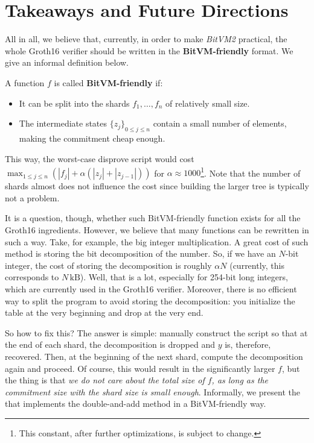 \documentclass{iacrtrans}
\begin{document}
\section{Takeaways and Future Directions}

All in all, we believe that, currently, in order to make
\textit{BitVM2} practical, the
whole Groth16 verifier should be written in the \textbf{BitVM-friendly} format.
We give an informal definition below.

\begin{definition}
  A function $f$ is called \textbf{BitVM-friendly} if:
  \begin{itemize}
    \item It can be split into the shards $f_1,\dots,f_n$ of
      relatively small size.
    \item The intermediate states ${\{z_j\}}_{0 \leq j \leq n}$ contain
      a small number of elements, making the commitment cheap enough.
  \end{itemize}

  This way, the worst-case disprove script would cost $\max_{1 \leq j \leq
  n}\left(|f_j| + \alpha(|z_j| + |z_{j-1}|)\right)$ for $\alpha \approx
  1000$\footnote{This constant, after further optimizations, is subject to
  change.}. Note that the number of shards almost does not influence the cost
  since building the larger tree is typically not a problem.
\end{definition}

It is a question, though, whether such BitVM-friendly function exists for all
the Groth16 ingredients. However, we believe that many functions can be
rewritten in such a way. Take, for example, the big integer multiplication. A
great cost of such method is storing the bit decomposition of the number. So, if
we have an $N$-bit integer, the cost of storing the decomposition is roughly
$\alpha N$ (currently, this corresponds to $N \, \text{kB}$). Well, that is a
lot, especially for 254-bit long integers, which are currently used in the
Groth16 verifier. Moreover, there is no efficient way to split the program to
avoid storing the decomposition: you initialize the table at the very beginning
and drop at the very end.

So how to fix this? The answer is simple: manually construct the script so that
at the end of each shard, the decomposition is dropped and $y$ is, therefore,
recovered. Then, at the beginning of the next shard, compute the decomposition
again and proceed. Of course, this would result in the significantly larger $f$,
but the thing is that \textit{we do not care about the total size of $f$, as
long as the commitment size with the shard size is small enough}. Informally, we
present the  that implements the
double-and-add method in a BitVM-friendly way.
\end{document}
